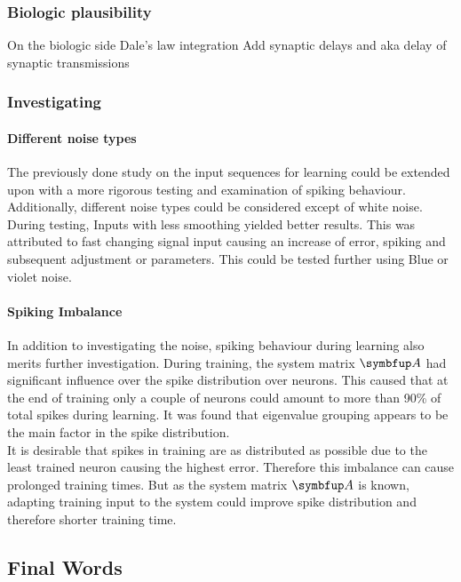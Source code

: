 \subsubsection{Biologic plausibility}
On the biologic side
Dale's law integration
Add synaptic delays and aka delay of synaptic transmissions


\subsubsection{Investigating}
\paragraph{Different noise types}
The previously done study on the input sequences for learning could be extended upon with a more rigorous testing and examination of spiking behaviour. Additionally, different noise types could be considered except of white noise. During testing, Inputs with less smoothing yielded better results. This was attributed to fast changing signal input causing an increase of error, spiking and subsequent adjustment or parameters. This could be tested further using Blue or violet noise.
\paragraph{Spiking Imbalance}
In addition to investigating the noise, spiking behaviour during learning also merits further investigation. During training, the system matrix $\bmu{A}$ had significant influence over the spike distribution over neurons. This caused that at the end of training only a couple of neurons could amount to more than 90\% of total spikes during learning. It was found that eigenvalue grouping appears to be the main factor in the spike distribution.\\
It is desirable that spikes in training are as distributed as possible due to the least trained neuron causing the highest error. Therefore this imbalance can cause prolonged training times. But as the system matrix $\bmu{A}$ is known, adapting training input to the system could improve spike distribution and therefore shorter training time.\\

\subsection{Final Words}
\listoftodos



